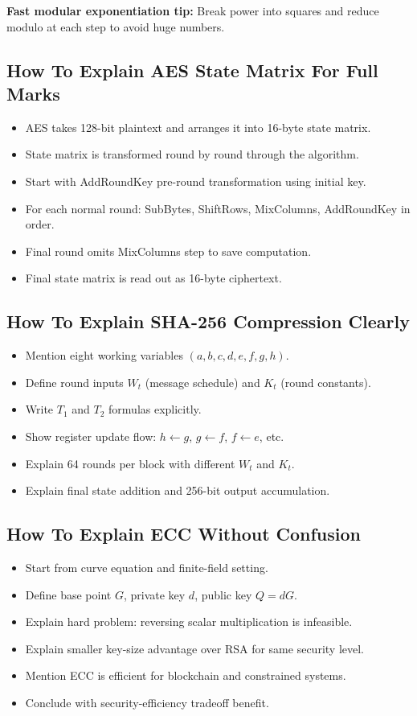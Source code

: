 \documentclass[12pt,a4paper]{article}
\begin{document}
\textbf{Fast modular exponentiation tip:}
Break power into squares and reduce modulo at each step to avoid huge numbers.

\subsection{How To Explain AES State Matrix For Full Marks}
\begin{itemize}
\item AES takes 128-bit plaintext and arranges it into 16-byte state matrix.
\item State matrix is transformed round by round through the algorithm.
\item Start with AddRoundKey pre-round transformation using initial key.
\item For each normal round: SubBytes, ShiftRows, MixColumns, AddRoundKey in order.
\item Final round omits MixColumns step to save computation.
\item Final state matrix is read out as 16-byte ciphertext.
\end{itemize}

\subsection{How To Explain SHA-256 Compression Clearly}
\begin{itemize}
\item Mention eight working variables \((a,b,c,d,e,f,g,h)\).
\item Define round inputs \(W_t\) (message schedule) and \(K_t\) (round constants).
\item Write \(T_1\) and \(T_2\) formulas explicitly.
\item Show register update flow: \(h \leftarrow g\), \(g \leftarrow f\), \(f \leftarrow e\), etc.
\item Explain 64 rounds per block with different \(W_t\) and \(K_t\).
\item Explain final state addition and 256-bit output accumulation.
\end{itemize}

\subsection{How To Explain ECC Without Confusion}
\begin{itemize}
\item Start from curve equation and finite-field setting.
\item Define base point \(G\), private key \(d\), public key \(Q=dG\).
\item Explain hard problem: reversing scalar multiplication is infeasible.
\item Explain smaller key-size advantage over RSA for same security level.
\item Mention ECC is efficient for blockchain and constrained systems.
\item Conclude with security-efficiency tradeoff benefit.
\end{itemize}
\end{document}
